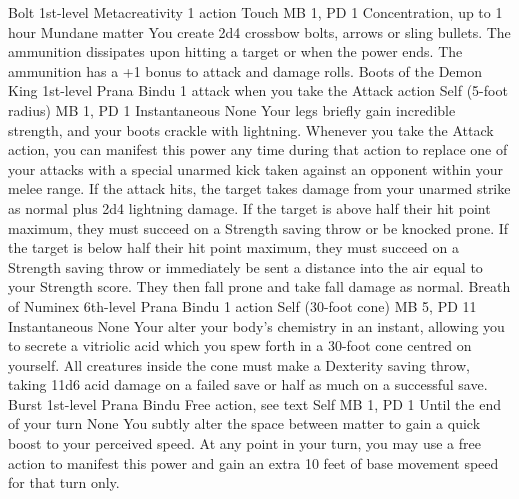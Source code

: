 \DndPowerHeader%
    {Bolt\label{pwr:bolt}}
    {1st-level Metacreativity}
    {1 action}
    {Touch}
    {MB 1, PD 1}
    {Concentration, up to 1 hour}
    {Mundane matter}
You create 2d4 crossbow bolts, arrows or
sling bullets. The ammunition dissipates upon hitting a target
or when the power ends. The ammunition has a +1 bonus to attack
and damage rolls.
\DndPowerHeader%
    {Boots of the Demon King\label{pwr:boots_of_the_demon_king}}
    {1st-level Prana Bindu}
    {1 attack when you take the Attack action}
    {Self (5-foot radius)}
    {MB 1, PD 1}
    {Instantaneous}
    {None}
Your legs briefly gain incredible strength,
and your boots crackle with lightning. Whenever you take the Attack
action, you can manifest this power any time during that action
to replace one of your attacks with a special unarmed
kick taken against an opponent within your melee range. If the
attack hits, the target takes damage from your unarmed strike
as normal plus 2d4 lightning damage. If the target is above
half their hit point maximum, they must succeed on a Strength
saving throw or be knocked prone. If the target is below half
their hit point maximum, they must succeed on a Strength saving
throw or immediately be sent a distance into the air equal
to your Strength score. They then fall prone and take fall
damage as normal.
\DndPowerHeader%
    {Breath of Numinex\label{pwr:breath_of_numinex}}
    {6th-level Prana Bindu}
    {1 action}
    {Self (30-foot cone)}
    {MB 5, PD 11}
    {Instantaneous}
    {None}
Your alter your body's chemistry in an instant,
allowing you to secrete a vitriolic acid which you spew forth
in a 30-foot cone centred on yourself. All creatures inside
the cone must make a Dexterity saving throw, taking 11d6 acid
damage on a failed save or half as much on a successful save.
\DndPowerHeader%
    {Burst\label{pwr:burst}}
    {1st-level Prana Bindu}
    {Free action, see text}
    {Self}
    {MB 1, PD 1}
    {Until the end of your turn}
    {None}
You subtly alter the space between matter
to gain a quick boost to your perceived speed. At any point
in your turn, you may use a free action to manifest this power
and gain an extra 10 feet of base movement speed for that
turn only.

